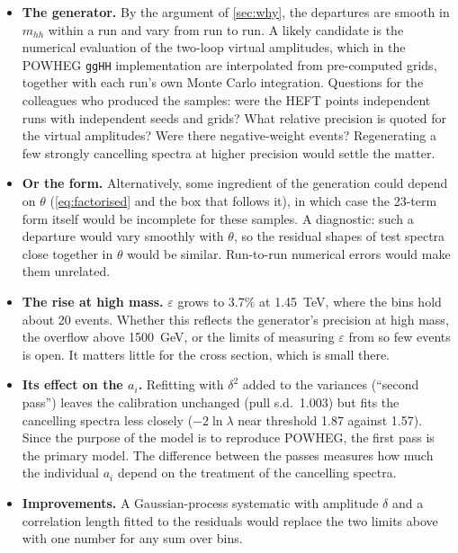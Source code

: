 \documentclass[11pt]{article}
\newcommand{\mhh}{m_{hh}}
\newcommand{\code}[1]{\texttt{#1}}
\begin{document}
\begin{itemize}
  \item \textbf{The generator.} By the argument of \cref{sec:why}, the departures are smooth in
    $\mhh$ within a run and vary from run to run. A likely candidate is the numerical
    evaluation of the two-loop virtual amplitudes, which in the POWHEG \code{ggHH}
    implementation are interpolated from pre-computed grids, together with each run's own
    Monte Carlo integration. Questions for the colleagues who produced the samples: were the
    HEFT points independent runs with independent seeds and grids? What relative precision is
    quoted for the virtual amplitudes? Were there negative-weight events? Regenerating a few
    strongly cancelling spectra at higher precision would settle the matter.
  \item \textbf{Or the form.} Alternatively, some ingredient of the generation could depend on
    $\theta$ (\cref{eq:factorised} and the box that follows it), in which case the 23-term form
    itself would be incomplete for these samples. A diagnostic: such a departure would vary
    smoothly with $\theta$, so the residual shapes of test spectra close together in $\theta$
    would be similar. Run-to-run numerical errors would make them unrelated.
  \item \textbf{The rise at high mass.} $\varepsilon$ grows to 3.7\% at 1.45~TeV, where the bins
    hold about 20 events. Whether this reflects the generator's precision at high mass, the
    overflow above 1500~GeV, or the limits of measuring $\varepsilon$ from so few events is
    open. It matters little for the cross section, which is small there.
  \item \textbf{Its effect on the $a_i$.} Refitting with $\delta^2$ added to the variances
    (``second pass'') leaves the calibration unchanged (pull s.d.\ 1.003) but fits the
    cancelling spectra less closely ($-2\ln\lambda$ near threshold 1.87 against 1.57). Since
    the purpose of the model is to reproduce POWHEG, the first pass is the primary model. The
    difference between the passes measures how much the individual $a_i$ depend on the
    treatment of the cancelling spectra.
  \item \textbf{Improvements.} A Gaussian-process systematic with amplitude $\delta$ and a
    correlation length fitted to the residuals would replace the two limits above with one
    number for any sum over bins.
\end{itemize}


\end{document}
